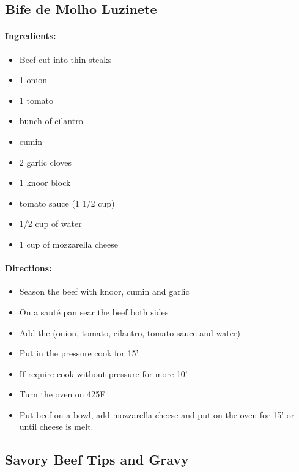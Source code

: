 \documentclass{article}
\begin{document}
\subsection{Bife de Molho Luzinete}

\paragraph{Ingredients:}
\begin{itemize}
    \item Beef cut into thin steaks
    \item 1 onion
    \item 1 tomato
    \item bunch of cilantro
    \item cumin
    \item 2 garlic cloves
    \item 1 knoor block
    \item tomato sauce (1 1/2 cup)
    \item 1/2 cup of water
    \item 1 cup of mozzarella cheese
\end{itemize}

\paragraph{Directions:}
\begin{itemize}
    \item Season the beef with knoor, cumin and garlic
    \item On a sauté pan sear the beef both sides
    \item Add the (onion, tomato, cilantro, tomato sauce and water)
    \item Put in the pressure cook for 15'
    \item If require cook without pressure for more 10'
    \item Turn the oven on 425F
    \item Put beef on a bowl, add mozzarella cheese and put on the oven for 15' or until cheese is melt.
\end{itemize}

\subsection{Savory Beef Tips and Gravy}
\end{document}
